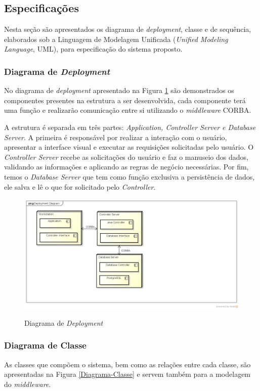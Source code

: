 \subsection{Especificações}
Nesta seção são apresentados os diagrama de \textit{deployment}, classe e de sequência, elaborados sob a Linguagem de Modelagem Unificada (\textit{Unified Modeling Language}, UML), para especificação do sistema proposto.

\subsubsection{Diagrama de \textit{Deployment}}
No diagrama de \textit{deployment} apresentado na Figura \ref{Diagrama-Deployment} são demonstrados os componentes presentes na estrutura a ser desenvolvida, cada componente terá uma função e realizarão comunicação entre si utilizando o \textit{middleware} CORBA.

A estrutura é separada em três partes: \textit{Application, Controller Server e Database Server}. A primeira é responsável por realizar a interação com o usuário, apresentar a interface visual e executar as requisições solicitadas pelo usuário. O \textit{Controller Server} recebe as solicitações do usuário e faz o manuseio dos dados, validando as informações e aplicando as regras de negócio necessárias. Por fim, temos o \textit{Database Server} que tem como função exclusiva a persistência de dados, ele salva e lê o que for solicitado pelo \textit{Controller}.

\begin{figure}[htb]
	\caption{Diagrama de \textit{Deployment}}
	{\parbox{6cm}{
			\includegraphics[width=14cm]{images/DeploymentDiagram.png}
			\label{Diagrama-Deployment}
	}}
\end{figure}

\subsubsection{Diagrama de Classe}
As classes que compõem o sistema, bem como as relações entre cada classe, são apresentadas
na Figura \ref{Diagrama-Classe} e servem também para a modelagem do \textit{middleware}.

